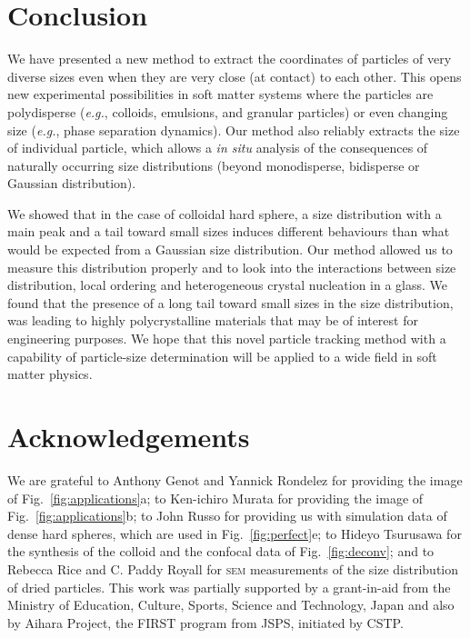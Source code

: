 \documentclass[8.5pt,twoside,twocolumn]{article}
\begin{document}
\section{Conclusion}
\label{sec:conclusion}

We have presented a new method to extract the coordinates of particles of very diverse sizes even when they are very close (at contact) to each other. This opens new experimental possibilities in soft matter systems where the particles are polydisperse (\emph{e.g.}, colloids, emulsions, and granular particles) or even changing size (\emph{e.g.}, phase separation dynamics). Our method also reliably extracts the size of individual particle, which allows a \emph{in situ} analysis of the consequences of naturally occurring size distributions (beyond monodisperse, bidisperse or Gaussian distribution).

We showed that in the case of colloidal hard sphere, a size distribution with a main peak and a tail toward small sizes induces different behaviours than what would be expected from a Gaussian size distribution. Our method allowed us to measure this distribution properly and to look into the interactions between size distribution, local ordering and heterogeneous crystal nucleation in a glass. We found that the presence of a long tail toward small sizes in the size distribution, was leading to highly polycrystalline materials that may be of interest for engineering purposes.
We hope that this novel particle tracking method with a capability of particle-size determination will be applied to a wide field in soft matter physics. 

\section*{Acknowledgements}
We are grateful to Anthony Genot and Yannick Rondelez for providing the image of Fig.~\ref{fig:applications}a; to Ken-ichiro Murata for providing the image of Fig.~\ref{fig:applications}b; to John Russo for providing us with simulation data of dense hard spheres, which are used in Fig.~\ref{fig:perfect}e; to Hideyo Tsurusawa for the synthesis of the colloid and the confocal data of Fig.~\ref{fig:deconv}; and to Rebecca Rice and C. Paddy Royall 
for \textsc{sem} measurements of the size distribution of dried particles. 
This work was partially supported by a grant-in-aid from the 
Ministry of Education, Culture, Sports, Science and Technology, Japan and also by 
Aihara Project, the FIRST program from JSPS, initiated by CSTP. 
\end{document}
